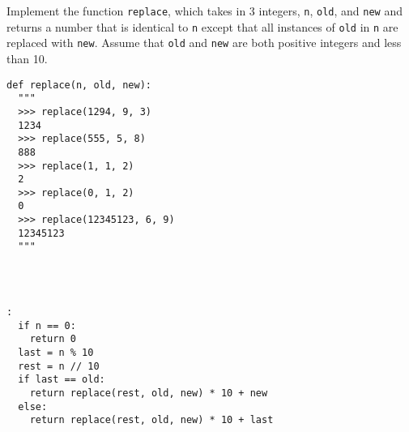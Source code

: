 \begin{blocksection}
\question Implement the function \texttt{replace}, which takes in 3 integers, \texttt{n}, \texttt{old}, and \texttt{new} and returns a number that is identical to \texttt{n} except that all instances of \texttt{old} in \texttt{n} are replaced with \texttt{new}. Assume that \texttt{old} and \texttt{new} are both positive integers and less than 10.

\begin{lstlisting}
def replace(n, old, new): 
  """ 
  >>> replace(1294, 9, 3)
  1234
  >>> replace(555, 5, 8)
  888
  >>> replace(1, 1, 2)
  2
  >>> replace(0, 1, 2)
  0
  >>> replace(12345123, 6, 9)
  12345123
  """


				
\end{lstlisting}
\end{blocksection}
\begin{blocksection}

\begin{solution}[.25in]
\begin{lstlisting}:
  if n == 0:
    return 0		
  last = n % 10
  rest = n // 10
  if last == old:
    return replace(rest, old, new) * 10 + new	
  else:
    return replace(rest, old, new) * 10 + last
\end{lstlisting}
\end{solution}
\end{blocksection}
